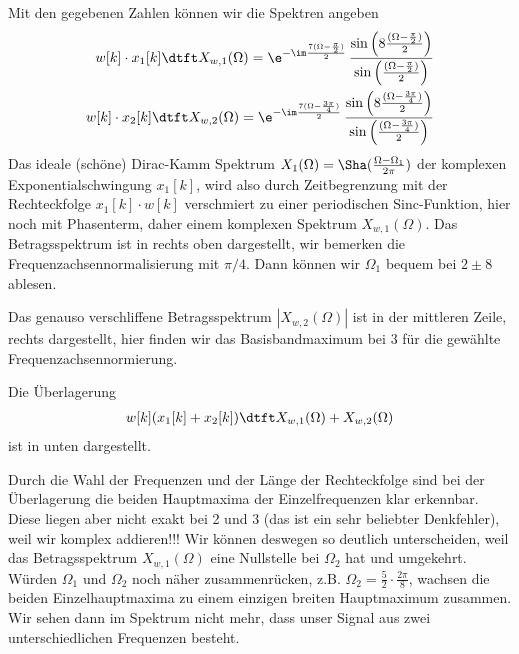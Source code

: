 \begin{Loesung}
Mit den gegebenen Zahlen können wir die Spektren angeben
\begin{align}
w[k] \cdot x_1[k]\dtft
X_{w,1}(\Omega) = \e^{-\im\frac{7(\Omega-\frac{\pi}{2})}{2}}\,
\frac{\sin\left(8\frac{(\Omega-\frac{\pi}{2})}{2}\right)}{\sin\left(\frac{(\Omega-\frac{\pi}{2})}{2}\right)}
%
\\
w[k] \cdot x_2[k]\dtft
X_{w,2}(\Omega) = \e^{-\im\frac{7(\Omega-\frac{3\pi}{4})}{2}}\,
\frac{\sin\left(8\frac{(\Omega-\frac{3\pi}{4})}{2}\right)}{\sin\left(\frac{(\Omega-\frac{3\pi}{4})}{2}\right)}
\end{align}
%
Das ideale (schöne) Dirac-Kamm Spektrum $X_1(\Omega)=\Sha(\frac{\Omega-\Omega_1}{2\pi})$
der komplexen Exponentialschwingung $x_1[k]$, wird also durch
Zeitbegrenzung mit der Rechteckfolge $x_1[k]\cdot w[k]$ verschmiert zu einer periodischen Sinc-Funktion,
hier noch mit Phasenterm, daher einem komplexen Spektrum $X_{w,1}(\Omega)$.
%
Das Betragsspektrum ist in  rechts oben dargestellt,
wir bemerken die Frequenzachsennormalisierung mit $\pi/4$. Dann können wir
$\Omega_1$ bequem bei $2 \pm 8$ ablesen.

Das genauso verschliffene Betragsspektrum $|X_{w,2}(\Omega)|$ ist in der mittleren Zeile, rechts
dargestellt, hier finden wir das Basisbandmaximum bei $3$ für die gewählte Frequenzachsennormierung.

Die Überlagerung
\begin{align}
w[k](x_1[k]+x_2[k]) \dtft   X_{w,1}(\Omega) + X_{w,2}(\Omega)
\end{align}
ist in  unten dargestellt.

Durch die Wahl der Frequenzen und der Länge der Rechteckfolge
sind bei der Überlagerung die beiden Hauptmaxima der Einzelfrequenzen klar erkennbar.
Diese liegen aber nicht exakt bei 2 und 3 (das ist ein sehr beliebter Denkfehler),
weil wir komplex addieren!!! Wir können
deswegen so deutlich unterscheiden, weil das Betragsspektrum
$X_{w,1}(\Omega)$ eine Nullstelle bei $\Omega_2$ hat und umgekehrt.
Würden $\Omega_1$ und $\Omega_2$ noch näher zusammenrücken, z.B. $\Omega_2=\frac{5}{2}\cdot\frac{2\pi}{8}$,
wachsen die beiden Einzelhauptmaxima zu einem einzigen breiten Hauptmaximum zusammen.
Wir sehen dann im Spektrum nicht mehr, dass unser Signal aus zwei unterschiedlichen Frequenzen besteht.
%
\end{Loesung}

